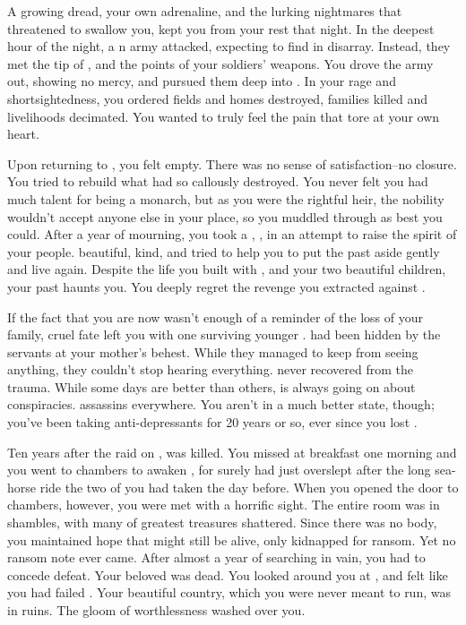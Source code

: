 \documentclass[char]{NeptuneBall}
\begin{document}
A growing dread, your own adrenaline, and the lurking nightmares that threatened to swallow you, kept you from your rest that night. In the deepest hour of the night, a \pPacifica{}n army attacked, expecting to find \pAtlantis{} in disarray. Instead, they met the tip of \iTrident{\MYname{}}, and the points of your soldiers' weapons. You drove the army out, showing no mercy, and pursued them deep into \pPacifica{}. In your rage and shortsightedness, you ordered fields and homes destroyed, families killed and livelihoods decimated. You wanted \pPacifica{} to truly feel the pain that tore at your own heart.

Upon returning to \pAtlantis{}, you felt empty. There was no sense of satisfaction--no closure. You tried to rebuild what \pPacifica{} had so callously destroyed. You never felt you had much talent for being a monarch, but as you were the rightful heir, the nobility wouldn't accept anyone else in your place, so you muddled through as best you could.  After a year of mourning, you took a \cQueen{\spouse{}}, \cQueen{\King{}} \cQueen{}, in an attempt to raise the spirit of your people. \cQueen{\They{}} \cQueen{\were} beautiful, kind, and tried to help you to put the past aside gently and live again. Despite the life you built with \cQueen{}, and your two beautiful children, your past haunts you. You deeply regret the revenge you extracted against \pPacifica{}. 

If the fact that you are now \cKing{\King} wasn't enough of a reminder of the loss of your family, cruel fate left you with one surviving younger \cPlant{\sibling}. \cPlant{} had been hidden by the servants at your mother's behest.  While they managed to keep \cPlant{\them} from seeing anything, they couldn't stop \cPlant{\them} hearing everything. \cPlant{} never recovered from the trauma.  While some days are better than others, \cPlant{} is always going on about conspiracies. \cPlant{\They}  assassins everywhere.  You aren't in a much better state, though; you've been taking anti-depressants for 20 years or so, ever since you lost \cQueen{}. 

Ten years after the raid on \pPacifica{}, \cQueen{} was killed. You missed \cQueen{\them} at breakfast one morning and you went to \cQueen{\their} chambers to awaken \cQueen{\them}, for surely \cQueen{\they} had just overslept after the long sea-horse ride the two of you had taken the day before. When you opened the door to \cQueen{\their} chambers, however, you were met with a horrific sight. The entire room was in shambles, with many of \cQueen{\their} greatest treasures shattered. Since there was no body, you maintained hope that \cQueen{\they} might still be alive, only kidnapped for ransom. Yet no ransom note ever came. After almost a year of searching in vain, you had to concede defeat. Your beloved \cQueen{} was dead. You looked around you at \pAtlantis{}, and felt like you had failed \cQueen{\them}. Your beautiful country, which you were never meant to run, was in ruins. The gloom of worthlessness washed over you.
\end{document}
